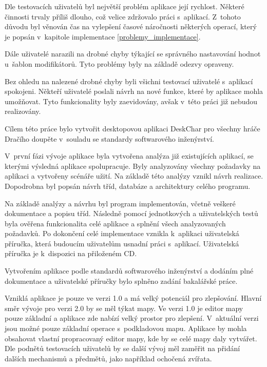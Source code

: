 \documentclass[thesis=B,czech]{resources/FITthesis}[2012/06/26]
\begin{document}
Dle testovacích uživatelů byl největší problém aplikace její rychlost. Některé činnosti trvaly příliš dlouho, což velice zdržovalo práci s~aplikací. Z~tohoto důvodu byl věnován čas na vylepšení časové náročnosti některých operací, který je popsán v~kapitole implementace \ref{problemy_implementace}. \par

Dále uživatelé narazili na drobné chyby týkající se správného nastavování hodnot u~šablon modifikátorů. Tyto problémy byly na základě odezvy opraveny. \par

Bez ohledu na nalezené drobné chyby byli všichni testovací uživatelé s~aplikací spokojeni. Někteří uživatelé poslali návrh na nové funkce, které by aplikace mohla umožňovat. Tyto funkcionality byly zaevidovány, avšak v~této práci již nebudou realizovány. 

\begin{conclusion}
Cílem této práce bylo vytvořit desktopovou aplikaci DeskChar pro všechny hráče Dračího doupěte v~souladu se standardy softwarového inženýrství. \par

V~první fázi vývoje aplikace byla vytvořena analýza již existujících aplikací, se kterými výsledná aplikace spolupracuje. Byly analyzovány všechny požadavky na aplikaci a vytvořeny scénáře užití. Na základě této analýzy vznikl návrh realizace. Dopodrobna byl popsán návrh tříd, databáze a architektury celého programu. \par

Na základě analýzy a návrhu byl program implementován, včetně veškeré dokumentace a popisu tříd. Následně pomocí jednotkových a uživatelských testů byla ověřena funkcionalita celé aplikace a splnění všech analyzovaných požadavků. Po dokončení celé implementace vznikla k~aplikaci uživatelská příručka, která budoucím uživatelům usnadní práci s~aplikací. Uživatelská příručka je k~dispozici na přiloženém CD. \par

Vytvořením aplikace podle standardů softwarového inženýrství a dodáním plné dokumentace a uživatelské příručky bylo splněno zadání bakalářské práce. \par

Vzniklá aplikace je pouze ve verzi 1.0 a má velký potenciál pro zlepšování. Hlavní směr vývoje pro verzi 2.0 by se měl týkat mapy. Ve verzi 1.0 je editor mapy pouze základní a aplikace zde nabízí velký prostor pro zlepšení. V~aktuální verzi jsou možné pouze základní operace s~podkladovou mapu. Aplikace by mohla obsahovat vlastní propracovaný editor mapy, kde by se celé mapy daly vytvářet. Dle podnětů testovacích uživatelů by se další vývoj měl zaměřit na přidání dalších mechanismů a předmětů, jako například ochočená zvířata.

\end{conclusion}
\end{document}
